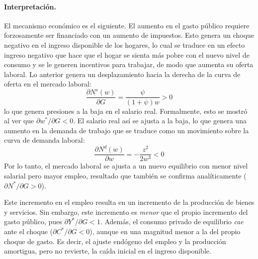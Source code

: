 \documentclass[11pt]{article}
\begin{document}
\paragraph{Interpretación.}

El mecanismo económico es el siguiente. El aumento en el gasto público requiere forzosamente ser financiado con un aumento de impuestos. Esto genera un choque negativo en el ingreso disponible de los hogares, lo cual se traduce en un efecto ingreso negativo que hace que el hogar se sienta más pobre con el nuevo nivel de consumo y se le generen incentivos para trabajar, de modo que aumenta su oferta laboral. Lo anterior genera un desplazamiento hacia la derecha de la curva de oferta en el mercado laboral:
\[
  \frac{\partial N^s(w)}{\partial G}
  =\frac{\psi}{(1 + \psi)w} > 0
\]
lo que genera presiones a la baja en el salario real. Formalmente, esto se mostró al ver que $\partial w^*/\partial G<0$. El salario real así se ajusta a la baja, lo que genera una aumento en la demanda de trabajo que se traduce como un movimiento sobre la curva de demanda laboral:
\[
  \frac{\partial N^d(w)}{\partial w}
  = -\frac{z^2}{2w^3} < 0
\]
Por lo tanto, el mercado laboral se ajusta a un nuevo equilibrio con menor nivel salarial pero mayor empleo, resultado que también se confirma analíticamente ($\partial N^*/\partial G>0$).

Este incremento en el empleo resulta en un incremento de la producción de bienes y servicios. Sin embargo, este incremento es \textit{menor} que el propio incremento del gasto público, pues $\partial Y^*/\partial G<1$. Además, el consumo privado de equilibrio \textit{cae} ante el choque ($\partial C^*/\partial G<0$), aunque en una magnitud menor a la del propio choque de gasto. Es decir, el ajuste endógeno del empleo y la producción amortigua, pero no revierte, la caída inicial en el ingreso disponible.
\end{document}
